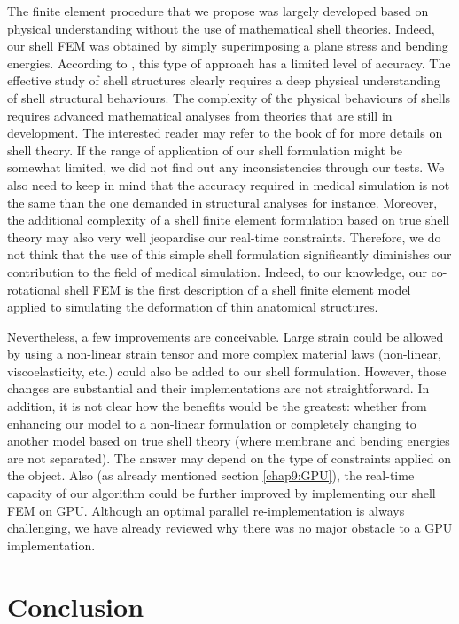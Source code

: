 The finite element procedure that we propose was largely developed based on physical understanding without the use of mathematical shell theories. Indeed, our shell FEM was obtained by simply superimposing a plane stress and bending energies. According to \cite{Chapelle03}, this type of approach has a limited level of accuracy. The effective study of shell structures clearly requires a deep physical understanding of shell structural behaviours. The complexity of the physical behaviours of shells requires advanced mathematical analyses from theories that are still in development. The interested reader may refer to the book of \cite{Chapelle03} for more details on shell theory. If the range of application of our shell formulation might be somewhat limited, we did not find out any inconsistencies through our tests. We also need to keep in mind that the accuracy required in medical simulation is not the same than the one demanded in structural analyses for instance. Moreover, the additional complexity of a shell finite element formulation based on true shell theory may also very well jeopardise our real-time constraints. Therefore, we do not think that the use of this simple shell formulation significantly diminishes our contribution to the field of medical simulation. Indeed, to our knowledge, our co-rotational shell FEM is the first description of a shell finite element model applied to simulating the deformation of thin anatomical structures. 

Nevertheless, a few improvements are conceivable. Large strain could be allowed by using a non-linear strain tensor and more complex material laws (non-linear, viscoelasticity, etc.) could also be added to our shell formulation. However, those changes are substantial and their implementations are not straightforward. In addition, it is not clear how the benefits would be the greatest: whether from enhancing our model to a non-linear formulation or completely changing to another model based on true shell theory (where membrane and bending energies are not separated). The answer may depend on the type of constraints applied on the object. Also (as already mentioned section \ref{chap9:GPU}), the real-time capacity of our algorithm could be further improved by implementing our shell FEM on GPU. Although an optimal parallel re-implementation is always challenging, we have already reviewed why there was no major obstacle to a GPU implementation. 

\section{Conclusion}

